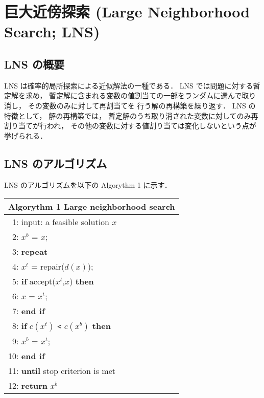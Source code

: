 \section{巨大近傍探索 (Large Neighborhood Search; LNS)}

\subsection{LNS の概要}
LNS は確率的局所探索による近似解法の一種である．
LNS では問題に対する暫定解を求め，
暫定解に含まれる変数の値割当ての一部をランダムに選んで取り消し，
その変数のみに対して再割当てを
行う解の再構築を繰り返す．
LNS の特徴として，
解の再構築では，
暫定解のうち取り消された変数に対してのみ再割り当てが行われ，
その他の変数に対する値割り当ては変化しないという点が挙げられる．

\subsection{LNS のアルゴリズム}
LNS のアルゴリズムを以下の Algorythm 1 に示す．
\begin{table}[htb]
\begin{tabular}{l}\hline
\textbf{Algorythm 1} Large neighborhood search\\ \hline
 ~1: input: a feasible solution $x$ \\
 ~2: $x^b$ = $x$; \\
 ~3: \bf{repeat} \\
 ~4: \quad \quad $x^t$ = repair($d(x)$); \\
 ~5: \quad \quad \textbf{if} accept($x^t$,$x$) \textbf{then} \\
 ~6: \quad \quad \quad \quad $x$ = $x^t$; \\
 ~7: \quad \quad \textbf{end if} \\
 ~8: \quad \quad \textbf{if} $c(x^t)$ \verb|<| $c(x^b)$ \textbf{then} \\
 ~9: \quad \quad \quad \quad $x^b$ = $x^t$; \\
10: \quad \quad \textbf{end if} \\
11: \textbf{until} stop criterion is met \\
12: \textbf{return} $x^b$ \\ \hline
\end{tabular}
\end{table}\\
